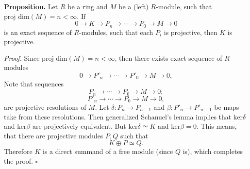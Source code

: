 \documentclass[12pt]{article}
\begin{document}
\textbf{Proposition.} Let $R$ be a ring and $M$ be a (left) $R$-module, such that $\mbox{proj dim}(M)=n<\infty$. If
$$0\rightarrow K\rightarrow P_{n}\rightarrow\cdots\rightarrow P_{0}\rightarrow M\rightarrow 0$$
is an exact sequence of $R$-modules, such that each $P_{i}$ is projective, then $K$ is projective.

\textit{Proof.} Since $\mbox{proj dim}(M)=n<\infty$, then there exists exact sequence of $R$-modules
$$0\rightarrow P'_{n}\rightarrow\cdots\rightarrow P'_{0}\rightarrow M\rightarrow 0,$$
Note that sequences
$$P_{n}\rightarrow\cdots\rightarrow P_{0}\rightarrow M\rightarrow 0;$$
$$P'_{n}\rightarrow\cdots\rightarrow P_{0}\rightarrow M\rightarrow 0,$$
are projective resolutions of $M$. Let $\delta:P_{n}\rightarrow P_{n-1}$ and $\beta:P'_{n}\rightarrow P'_{n-1}$ be maps take from these resolutions. Then generalized Schanuel's lemma implies that $\mathrm{ker}\delta$ and $\mathrm{ker}\beta$ are projectively equivalent. But $\mathrm{ker}\delta\simeq K$ and $\mathrm{ker}\beta=0$. This means, that there are projective modules $P,Q$ such that
$$K\oplus P\simeq Q.$$
Therefore $K$ is a direct summand of a free module (since $Q$ is), which completes the proof. $\square$
\end{document}
